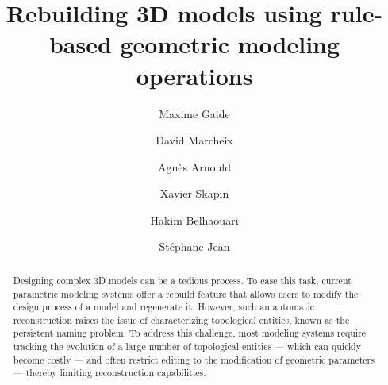 \documentclass[preprint,review,12pt,x11names]{elsarticle}
\begin{document}
\begin{frontmatter}



	\title{Rebuilding 3D models using rule-based geometric modeling operations}

	\author[lias]{Maxime Gaide}
	\author[lias]{David Marcheix}
	\author[xlim]{Agn\`{e}s Arnould}
	\author[xlim]{Xavier Skapin}
	\author[xlim]{Hakim Belhaouari}
	\author[lias]{St\'{e}phane Jean}



	\begin{abstract}
		\begin{linenumbers}
			Designing complex 3D models can be a tedious process. %
			To ease this task, current parametric modeling systems offer a rebuild
			feature that allows users to modify the design process of a model and
			regenerate it. %
			However, such an automatic reconstruction raises the issue of
			characterizing topological entities, known as the persistent naming
			problem. %
			To address this challenge, most modeling systems require tracking the
			evolution of a large number of topological entities — which can quickly
			become costly — and often restrict editing to the modification of
			geometric parameters — thereby limiting reconstruction capabilities. %


\end{linenumbers}
\end{abstract}
\end{frontmatter}
\end{document}
